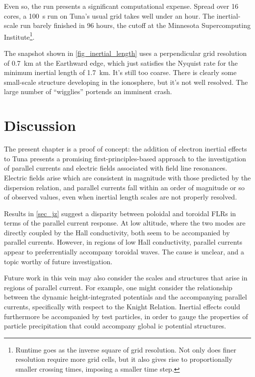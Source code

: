 Even so, the run presents a significant computational expense. Spread over 16 cores, a \SI{100}{\s} run on Tuna's usual grid takes well under an hour. The inertial-scale run barely finished in 96 hours, the cutoff at the Minnesota Supercomputing Institute\footnote{Runtime goes as the inverse square of grid resolution. Not only does finer resolution require more grid cells, but it also gives rise to proportionally smaller crossing times, imposing a smaller time step. }.

The snapshot shown in \cref{fig_inertial_length} uses a perpendicular grid resolution of \SI{0.7}{\km} at the Earthward edge, which just satisfies the Nyquist rate for the minimum inertial length of \SI{1.7}{\km}. It's still too coarse. There is clearly some small-scale structure developing in the ionosphere, but it's not well resolved. The large number of ``wigglies'' portends an imminent crash. 


\section{Discussion}

The present chapter is a proof of concept: the addition of electron inertial effects to Tuna presents a promising first-principles-based approach to the investigation of parallel currents and electric fields associated with field line resonances. Electric fields arise which are consistent in magnitude with those predicted by the dispersion relation, and parallel currents fall within an order of magnitude or so of observed values, even when inertial length scales are not properly resolved. 

Results in \cref{sec_jz} suggest a disparity between poloidal and toroidal FLRs in terms of the parallel current response. At low altitude, where the two modes are directly coupled by the Hall conductivity, both seem to be accompanied by parallel currents. However, in regions of low Hall conductivity, parallel currents appear to preferrentially accompany toroidal waves. The cause is unclear, and a topic worthy of future investigation. 

Future work in this vein may also consider the scales and structures that arise in regions of parallel current. For example, one might consider the relationship between the dynamic height-integrated potentials and the accompanying parallel currents, specifically with respect to the Knight Relation\cite{knight_1973}. Inertial effects could furthermore be accompanied by test particles, in order to gauge the properties of particle precipitation that could accompany global \Alfven{}ic potential structures. 

